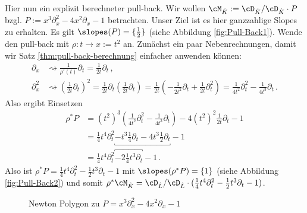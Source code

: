 \begin{exmp}\label{exmp:Pull-Back}
Hier nun ein explizit berechneter pull-back.
Wir wollen $\cM_{\hat K}:=\cD_{\hat K}/\cD_{\hat K}\cdot P$ bzgl. $P:=
x^3\partial_x^2-4x^2\partial_x-1$ betrachten.
Unser Ziel ist es hier ganzzahlige Slopes zu erhalten.
Es gilt $\slopes(P)=\{\frac{1}{2}\}$ (siehe Abbildung \ref{fig:Pull-Back1}).
Wende den pull-back mit $\rho:t\rightarrow x:=t^2$ an.
Zunächst ein paar Nebenrechnungen, damit wir Satz
\ref{thm:pull-back-berechnung} einfacher anwenden können:
\begin{align*}
\partial_x   &\rightsquigarrow
  \frac{1}{\rho'(t)}\partial_t=\frac{1}{2t}\partial_t \,,
\\\partial_x^2 &\rightsquigarrow (\frac{1}{2t}\partial_t)^2
  = \frac{1}{2t}\partial_t (\frac{1}{2t}\partial_t)
  = \frac{1}{2t}(-\frac{1}{2t^2}\partial_t + \frac{1}{2t}\partial_t^2)
  = \frac{1}{4t^2}\partial_t^2-\frac{1}{4t^3}\partial_t \,.
\end{align*}
Also ergibt Einsetzen
\begin{align*}
\rho^*P &= (t^2)^3(\frac{1}{4t^2}\partial_t^2-\frac{1}{4t^3}\partial_t)-
    4(t^2)^2\frac{1}{2t}\partial_t-1
\\&= \frac{1}{4}t^4\partial_t^2 \underbracket{-t^3\frac{1}{4}\partial_t-
    4t^{3}\frac{1}{2}\partial_t}-1
\\&= \frac{1}{4}t^4\partial_t^2 \overbracket{-2\frac{1}{4}t^3\partial_t}-1 \,.
\end{align*}
%
Also ist $\rho^*P= \frac{1}{4}t^4\partial_t^2 -\frac{1}{2}t^3\partial_t-1$ mit
$ \slopes(\rho^*P)=\{1\} $ (siehe Abbildung \ref{fig:Pull-Back2}) und somit
$\rho^*\cM_{\hat K}=\cD_{\hat L}/\cD_{\hat L}
\cdot(\frac{1}{4}t^4\partial_t^2-\frac{1}{2}t^3\partial_t-1)$.
\begin{figure}[htbp]
  \begin{minipage}[hbt]{0,49\textwidth}
  \begin{center}
  \end{center}
  \caption[Newton Polygon zu $P=x^3\partial_x^2-4x^2\partial_x-1$]
    {Newton Polygon zu \newline $P=x^3\partial_x^2-4x^2\partial_x-1$}

\end{minipage}
\end{figure}
\end{exmp}
